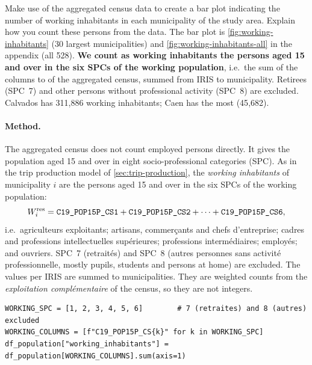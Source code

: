 \begin{qa}{Make use of the aggregated census data to create a bar plot indicating the number of working inhabitants in
each municipality of the study area. Explain how you count these persons from the data.}
The bar plot is \cref{fig:working-inhabitants} (30 largest municipalities) and \cref{fig:working-inhabitants-all} in
the appendix (all 528). \textbf{We count as working inhabitants the persons aged 15 and over in the six SPCs of the
working population}, i.e.\ the sum of the columns  to  of the
aggregated census, summed from IRIS to municipality. Retirees (SPC~7) and other persons without professional activity
(SPC~8) are excluded. Calvados has 311{,}886 working inhabitants; Caen has the most (45{,}682).
\end{qa}

\paragraph{Method.}
The aggregated census does not count employed persons directly. It gives the population aged 15 and over in eight
socio-professional categories (SPC). As in the trip production model of \cref{sec:trip-production}, the
\emph{working inhabitants} of municipality $i$ are the persons aged 15 and over in the six SPCs of the working
population:
\begin{equation*}
  W^{\mathrm{res}}_i = \texttt{C19\_POP15P\_CS1} + \texttt{C19\_POP15P\_CS2} + \dots + \texttt{C19\_POP15P\_CS6},
\end{equation*}
i.e.\ agriculteurs exploitants; artisans, commer\c{c}ants and chefs d'entreprise; cadres and professions
intellectuelles sup\'erieures; professions interm\'ediaires; employ\'es; and ouvriers. SPC~7 (retrait\'es) and SPC~8
(autres personnes sans activit\'e professionnelle, mostly pupils, students and persons at home) are excluded. The
values per IRIS are summed to municipalities. They are weighted counts from the \emph{exploitation compl\'ementaire}
of the census, so they are not integers.
\begin{lstlisting}[style=py]
WORKING_SPC = [1, 2, 3, 4, 5, 6]        # 7 (retraites) and 8 (autres) excluded
WORKING_COLUMNS = [f"C19_POP15P_CS{k}" for k in WORKING_SPC]
df_population["working_inhabitants"] = df_population[WORKING_COLUMNS].sum(axis=1)
\end{lstlisting}

